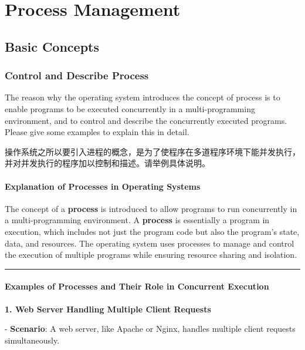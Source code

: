 \documentclass[a4paper]{book}
\begin{document}
\chapter{Process Management}

\section{Basic Concepts}

\subsection{Control and Describe Process}

\begin{greenbox}
The reason why the operating system introduces the concept of process is to enable programs to be executed concurrently in a multi-programming environment, and to control and describe the concurrently executed programs. Please give some examples to explain this in detail.
\end{greenbox}

操作系统之所以要引入进程的概念，是为了使程序在多道程序环境下能并发执行，并对并发执行的程序加以控制和描述。请举例具体说明。 

\subsubsection{Explanation of Processes in Operating Systems}

The concept of a \textbf{process} is introduced to allow programs to run concurrently in a multi-programming environment. A \textbf{process} is essentially a program in execution, which includes not just the program code but also the program's state, data, and resources. The operating system uses processes to manage and control the execution of multiple programs while ensuring resource sharing and isolation.

\rule{0.75\textwidth}{0.5pt}

\subsubsection{Examples of Processes and Their Role in Concurrent Execution}

\textbf{1. Web Server Handling Multiple Client Requests}

   - \textbf{Scenario}: A web server, like Apache or Nginx, handles multiple client requests simultaneously.
   
\end{document}
